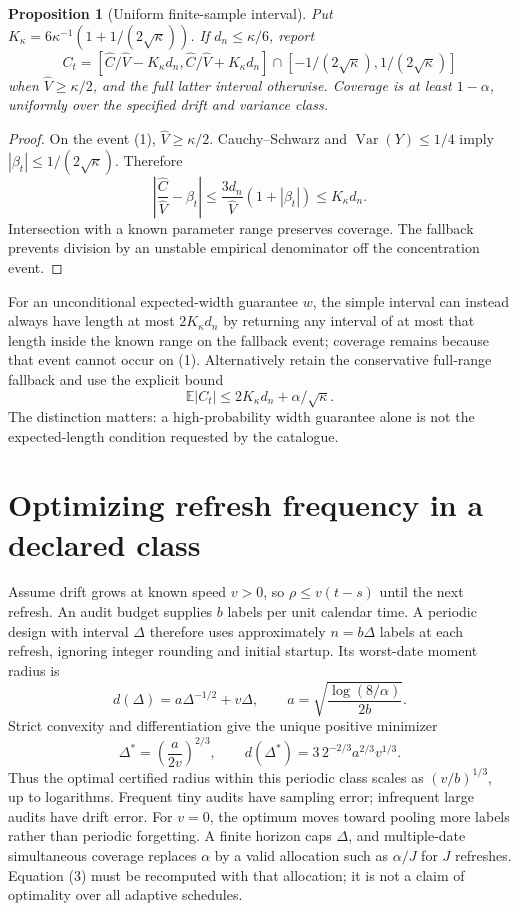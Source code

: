 \documentclass[11pt]{article}
\newtheorem{proposition}{Proposition}
\newcommand{\E}{\mathbb E}
\newcommand{\Var}{\operatorname{Var}}
\begin{document}
\begin{proposition}[Uniform finite-sample interval]
Put $K_\kappa=6\kappa^{-1}(1+1/(2\sqrt\kappa))$. If $d_n\leq\kappa/6$, report
\[
 C_t=\left[\widehat C/\widehat V-K_\kappa d_n,
 \widehat C/\widehat V+K_\kappa d_n\right]
 \cap[-1/(2\sqrt\kappa),1/(2\sqrt\kappa)]
\]
when $\widehat V\geq\kappa/2$, and the full latter interval otherwise. Coverage is at least $1-\alpha$, uniformly over the specified drift and variance class.
\end{proposition}
\begin{proof}
On the event (1), $\widehat V\geq\kappa/2$. Cauchy--Schwarz and $\Var(Y)\leq1/4$ imply $|\beta_t|\leq1/(2\sqrt\kappa)$. Therefore
\[
 \left|\frac{\widehat C}{\widehat V}-\beta_t\right|
 \leq\frac{3d_n}{\widehat V}(1+|\beta_t|)
 \leq K_\kappa d_n.
\]
Intersection with a known parameter range preserves coverage. The fallback prevents division by an unstable empirical denominator off the concentration event.
\end{proof}

For an unconditional expected-width guarantee $w$, the simple interval can instead always have length at most $2K_\kappa d_n$ by returning any interval of at most that length inside the known range on the fallback event; coverage remains because that event cannot occur on (1). Alternatively retain the conservative full-range fallback and use the explicit bound
\[
 \E|C_t|\leq2K_\kappa d_n+\alpha/\sqrt\kappa.
\]
The distinction matters: a high-probability width guarantee alone is not the expected-length condition requested by the catalogue.

\section*{Optimizing refresh frequency in a declared class}
Assume drift grows at known speed $v>0$, so $\rho\leq v(t-s)$ until the next refresh. An audit budget supplies $b$ labels per unit calendar time. A periodic design with interval $\Delta$ therefore uses approximately $n=b\Delta$ labels at each refresh, ignoring integer rounding and initial startup. Its worst-date moment radius is
\[
 d(\Delta)=a\Delta^{-1/2}+v\Delta,
 \qquad a=\sqrt{\frac{\log(8/\alpha)}{2b}}.
\]
Strict convexity and differentiation give the unique positive minimizer
\[
 \Delta^*=\left(\frac a{2v}\right)^{2/3},\qquad
 d(\Delta^*)=3\,2^{-2/3}a^{2/3}v^{1/3}.             \tag{3}
\]
Thus the optimal certified radius within this periodic class scales as $(v/b)^{1/3}$, up to logarithms. Frequent tiny audits have sampling error; infrequent large audits have drift error. For $v=0$, the optimum moves toward pooling more labels rather than periodic forgetting. A finite horizon caps $\Delta$, and multiple-date simultaneous coverage replaces $\alpha$ by a valid allocation such as $\alpha/J$ for $J$ refreshes. Equation (3) must be recomputed with that allocation; it is not a claim of optimality over all adaptive schedules.
\end{document}
